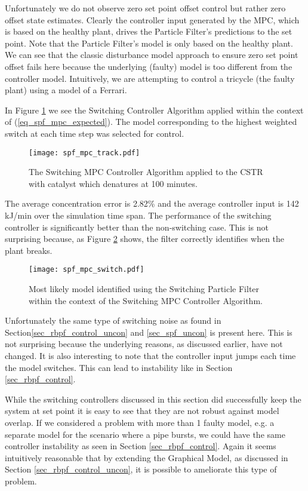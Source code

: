 Unfortunately we do not observe zero set point offset control but rather zero offset state estimates. Clearly the controller input generated by the MPC, which is based on the healthy plant, drives the Particle Filter's predictions to the set point. Note that the Particle Filter's model is only based on the healthy plant. We can see that the classic disturbance model approach \cite{lee} to ensure zero set point offset fails here because the underlying (faulty) model is too different from the controller model. Intuitively, we are attempting to control a tricycle (the faulty plant) using a model of a Ferrari.  

In Figure \ref{fig_spf_mpc_track} we see the Switching Controller Algorithm applied within the context of (\ref{eq_spf_mpc_expected}). The model corresponding to the highest weighted switch at each time step was selected for control.
\begin{figure}[H] 
\centering
\texttt{[image: spf\_mpc\_track.pdf]}
\caption{The Switching MPC Controller Algorithm applied to the CSTR with catalyst which denatures at 100 minutes.}
\label{fig_spf_mpc_track}
\end{figure}
The average concentration error is 2.82\% and the average controller input is 142 kJ/min over the simulation time span. The performance of the switching controller is significantly better than the non-switching case. This is not surprising because, as Figure \ref{fig_spf_mpc_switch} shows, the filter correctly identifies when the plant breaks.
\begin{figure}[H] 
\centering
\texttt{[image: spf\_mpc\_switch.pdf]}
\caption{Most likely model identified using the Switching Particle Filter within the context of the Switching MPC Controller Algorithm.}
\label{fig_spf_mpc_switch}
\end{figure}
Unfortunately the same type of switching noise as found in Section\ref{sec_rbpf_control_uncon} and \ref{sec_spf_uncon} is present here. This is not surprising because the underlying reasons, as discussed earlier, have not changed. It is also interesting to note that the controller input jumps each time the model switches. This can lead to instability like in Section \ref{sec_rbpf_control}.

While the switching controllers discussed in this section did successfully keep the system at set point it is easy to see that they are not robust against model overlap. If we considered a problem with more than 1 faulty model, e.g. a separate model for the scenario where a pipe bursts, we could have the same controller instability as seen in Section \ref{sec_rbpf_control}. Again it seems intuitively reasonable that by extending the Graphical Model, as discussed in Section \ref{sec_rbpf_control_uncon}, it is possible to ameliorate this type of problem.   

